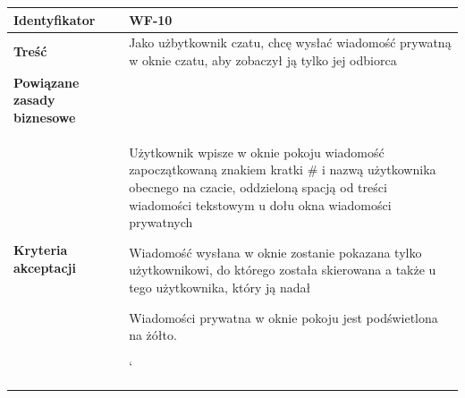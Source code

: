\begin{tabular}{ | l | l | }
	\hline
		\textbf{Identyfikator} & 
		WF-10
		\\
		
	\hline
		\textbf{Treść} & \parbox[t]{11cm}{
			Jako użbytkownik czatu, chcę wysłać wiadomość
			prywatną w oknie czatu, aby zobaczył ją tylko jej
			odbiorca
		}\\
		 
	\hline
		\parbox[t]{4cm}{\textbf{Powiązane zasady biznesowe}} & \parbox[t]{11cm}{
			
			
		}\\
		
	\hline
		\parbox[t]{4cm}{\textbf{Kryteria akceptacji}} & \parbox[t]{11cm}{
			\begin{enumreq}
				\item Użytkownik wpisze w oknie pokoju 
				wiadomość zapoczątkowaną znakiem kratki \# i nazwą 
				użytkownika obecnego na czacie, oddzieloną spacją 
				od treści wiadomości
				tekstowym u dołu okna wiadomości prywatnych
				\item Wiadomość wysłana w oknie zostanie pokazana
				tylko użytkownikowi, do którego została skierowana
				a także u tego użytkownika, który ją nadał
				\item Wiadomości prywatna w oknie pokoju jest
				podświetlona na żółto.
			\end{enumreq}`								
			}
		\\

	\hline
\end{tabular}


\vspace{2em} 

